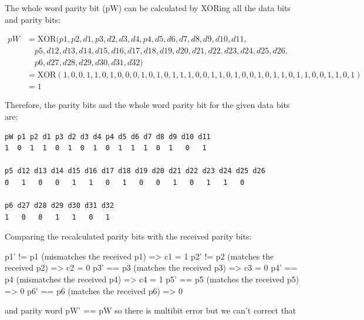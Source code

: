 \documentclass[a4paper,11pt]{article}%
\newenvironment{qanda}{\setlength{\parindent}{0pt}}{\bigskip}
\begin{document}
\begin{qanda}
	The whole word parity bit (pW) can be calculated by XORing all the data bits and parity bits:
	
	\begin{align*}
pW &= \text{XOR}(p1, p2, d1, p3, d2, d3, d4, p4, d5, d6, d7, d8, d9, d10, d11, \\
&\quad p5, d12, d13, d14, d15, d16, d17, d18, d19, d20, d21, d22, d23, d24, d25, d26, \\
&\quad p6, d27, d28, d29, d30, d31, d32) \\
&= \text{XOR}(1, 0, 0, 1, 1, 0, 1, 0, 0, 0, 1, 0, 1, 0, 1, 1, 1, 0, 0, 1, 1, 0, 1, 0, 0, 1, 0, 1, 1, 0, 1, 1, 0, 0, 1, 1, 0, 1) \\
&= 1
	\end{align*}
	
	Therefore, the parity bits and the whole word parity bit for the given data bits are:


	\begin{verbatim}
pW p1 p2 d1 p3 d2 d3 d4 p4 d5 d6 d7 d8 d9 d10 d11
1  0  1  1  0  1  0  1  0  1  1  1  0  1   0   1

p5 d12 d13 d14 d15 d16 d17 d18 d19 d20 d21 d22 d23 d24 d25 d26
0   1   0   0   1   1   0   1   0   0   1   0   1   1   0

p6 d27 d28 d29 d30 d31 d32
1   0   0   1   1   0   1
		\end{verbatim}

Comparing the recalculated parity bits with the received parity bits:

p1' != p1 (mismatches the received p1) => c1 = 1
p2' != p2 (matches the received p2) => c2 = 0
p3' == p3 (matches the received p3) => c3 = 0
p4' == p4 (mismatches the received p4) => c4 = 1
p5' == p5 (matches the received p5) => 0
p6' == p6 (matches the received p6) => 0

and parity word pW' == pW so there is multibit error but we can't correct that

	\pagebreak

\end{qanda}
\end{document}
